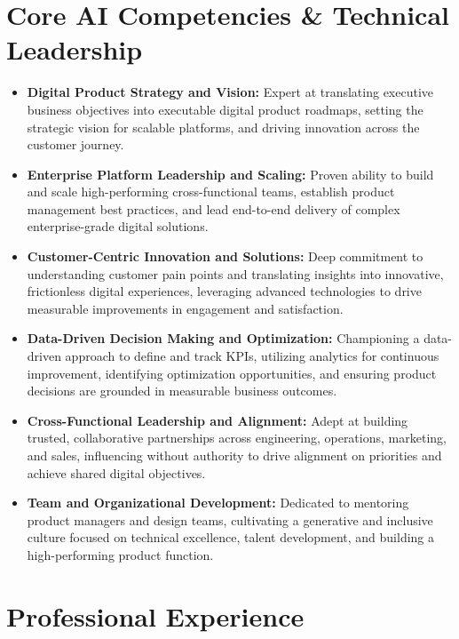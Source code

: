 \documentclass[9pt, letterpaper]{extarticle}
\begin{document}
\section{Core AI Competencies \& Technical Leadership}
\begin{itemize}
\item \textbf{Digital Product Strategy  and  Vision:} Expert at translating executive business objectives into executable digital product roadmaps, setting the strategic vision for scalable platforms, and driving innovation across the customer journey.\item \textbf{Enterprise Platform Leadership  and  Scaling:} Proven ability to build and scale high-performing cross-functional teams, establish product management best practices, and lead end-to-end delivery of complex enterprise-grade digital solutions.\item \textbf{Customer-Centric Innovation  and  Solutions:} Deep commitment to understanding customer pain points and translating insights into innovative, frictionless digital experiences, leveraging advanced technologies to drive measurable improvements in engagement and satisfaction.\item \textbf{Data-Driven Decision Making  and  Optimization:} Championing a data-driven approach to define and track KPIs, utilizing analytics for continuous improvement, identifying optimization opportunities, and ensuring product decisions are grounded in measurable business outcomes.\item \textbf{Cross-Functional Leadership  and  Alignment:} Adept at building trusted, collaborative partnerships across engineering, operations, marketing, and sales, influencing without authority to drive alignment on priorities and achieve shared digital objectives.\item \textbf{Team  and  Organizational Development:} Dedicated to mentoring product managers and design teams, cultivating a generative and inclusive culture focused on technical excellence, talent development, and building a high-performing product function.
\end{itemize}

\section{Professional Experience}
\end{document}
